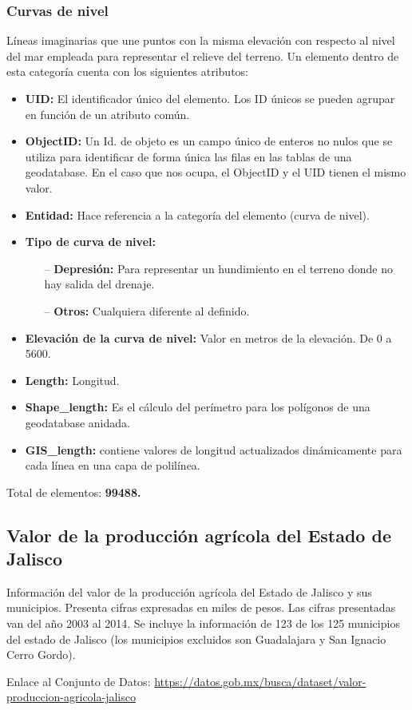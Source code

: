 \documentclass[10pt,letterpaper]{article}
\newcommand{\descripcion}{Un elemento dentro de esta categoría cuenta con los siguientes atributos:}
\newcommand{\total}{Total de elementos: }
\newcommand{\UID}{\textbf{UID:} El identificador único del elemento. Los ID únicos se pueden agrupar en función de un atributo común.}
\newcommand{\OID}{\textbf{ObjectID:} Un Id. de objeto es un campo único de enteros no nulos que se utiliza para identificar de forma única las filas en las tablas de una geodatabase. En el caso que nos ocupa, el ObjectID y el UID tienen el mismo valor.}
\newcommand{\ent}{\textbf{Entidad:} Hace referencia a la categoría del elemento }
\newcommand{\SHL}{\textbf{Shape\_length:} Es el cálculo del perímetro para los polígonos de una geodatabase anidada.}
\newcommand{\GISL}{\textbf{GIS\_length:} contiene valores de longitud actualizados dinámicamente para cada línea en una capa de polilínea.}
\begin{document}
\subsubsection{Curvas de nivel}
Líneas imaginarias que une puntos con la misma elevación con respecto al nivel del mar empleada para representar el relieve del terreno. \descripcion
\begin{itemize}
	\item \UID
	\item \OID
	\item \ent (curva de nivel).
	\item \textbf{Tipo de curva de nivel:}
	\begin{itemize}
		\item[--] \textbf{Depresión:} Para representar un hundimiento en el terreno donde no hay salida del drenaje.
		\item[--] \textbf{Otros:} Cualquiera diferente al definido.
	\end{itemize}
	\item \textbf{Elevación de la curva de nivel:} Valor en metros de la elevación. De 0 a 5600.
	\item \textbf{Length:} Longitud.
	\item \SHL
	\item \GISL
\end{itemize}
\total \textbf{99488.}

\subsection{Valor de la producción agrícola del Estado de Jalisco}

Información del valor de la producción agrícola del Estado de Jalisco y sus municipios. Presenta cifras expresadas en miles de pesos. Las cifras presentadas van del año 2003 al 2014. Se incluye la información de 123 de los 125 municipios del estado de Jalisco (los municipios excluidos son Guadalajara y San Ignacio Cerro Gordo).

Enlace al Conjunto de Datos:
\url{https://datos.gob.mx/busca/dataset/valor-produccion-agricola-jalisco}
\end{document}
